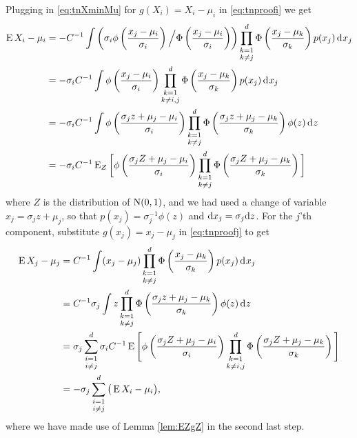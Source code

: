 Plugging in \cref{eq:tnXminMu} for $g(X_i)=X_i - \mu_i$ in \cref{eq:tnproofi} we get
\begin{align*}
  \operatorname{E} X_i - \mu_i
  &= -C^{-1} \int  \left(  \sigma_i  \phi \left( \frac{x_j-\mu_i}{\sigma_i} \right) \Big/ \Phi \left( \frac{x_j-\mu_i}{\sigma_i}\right)  \right)  \mathop{\prod_{k=1}^d}_{k \neq j} \Phi \left( \frac{x_j - \mu_k}{\sigma_k} \right)  p(x_j) \operatorname{d}\hspace{0.5pt}\! x_j \\
  &= - \sigma_i C^{-1} \int  \phi \left( \frac{x_j-\mu_i}{\sigma_i} \right)  \mathop{\prod_{k=1}^d}_{k \neq i,j} \Phi \left( \frac{x_j - \mu_k}{\sigma_k} \right)  p(x_j) \operatorname{d}\hspace{0.5pt}\! x_j \\
  &= - \sigma_i C^{-1} \int  \phi \left( \frac{\sigma_j z + \mu_j -\mu_i}{\sigma_i} \right)  \mathop{\prod_{k=1}^d}_{k \neq j} \Phi \left( \frac{\sigma_j z + \mu_j - \mu_k}{\sigma_k} \right)  \phi(z) \operatorname{d}\hspace{0.5pt}\! z \\
  &= - \sigma_i C^{-1} \operatorname{E}_Z\bigg[ \phi \left( \frac{\sigma_j Z + \mu_j -\mu_i}{\sigma_i} \right)  \mathop{\prod_{k=1}^d}_{k \neq j} \Phi \left( \frac{\sigma_j Z + \mu_j - \mu_k}{\sigma_k} \right) \bigg]
\end{align*}
where $Z$ is the distribution of $\operatorname{N}(0,1)$, and we had used a change of variable $x_j = \sigma_j z + \mu_j$, so that $p(x_j) = \sigma_j^{-1} \phi(z)$ and $\text{d} x_j = \sigma_j \text{d} z$.
For the $j$'th component, substitute $g(x_j) = x_j - \mu_j$ in \cref{eq:tnproofj} to get
\begin{align*}
  \operatorname{E} X_j - \mu_j
  &= C^{-1} \int (x_j - \mu_j)  \mathop{\prod_{k=1}^d}_{k \neq j} \Phi \left( \frac{x_j - \mu_k}{\sigma_k} \right) p(x_j) \operatorname{d}\hspace{0.5pt}\! x_j \\
  &= C^{-1} \sigma_j  \int z  \mathop{\prod_{k=1}^d}_{k \neq j} \Phi \left( \frac{\sigma_j z + \mu_j - \mu_k}{\sigma_k} \right) \phi(z) \operatorname{d}\hspace{0.5pt}\! z \\
  &= \sigma_j  \mathop{\sum_{i=1}^d}_{i \neq j} \sigma_i C^{-1} \operatorname{E} \Bigg[ \phi \left( \frac{\sigma_j Z + \mu_j - \mu_i}{\sigma_i} \right) \mathop{\prod_{k=1}^d}_{k \neq i,j} \Phi \left( \frac{\sigma_j Z + \mu_j - \mu_k}{\sigma_k} \right) \Bigg] \\
  &= - \sigma_j \mathop{\sum_{i=1}^d}_{i \neq j} \big(\operatorname{E} X_i - \mu_i \big),
\end{align*}
where we have made use of Lemma \ref{lem:EZgZ} in the second last step.

